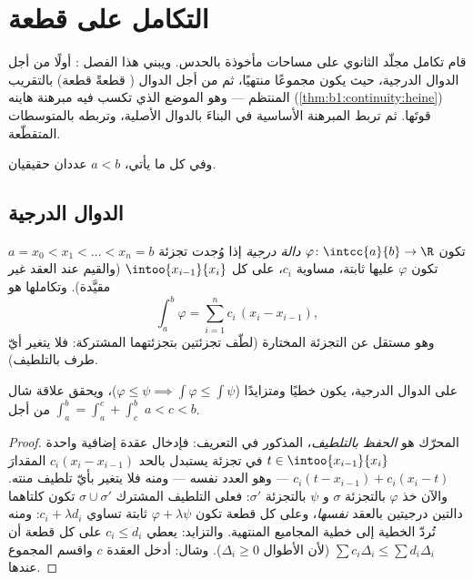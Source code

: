 \chapter{التكامل على قطعة}\label{ch:b1:integration}

قام تكامل مجلّد الثانوي على مساحات مأخوذة
بالحدس. ويبني هذا الفصل : أولًا من أجل الدوال الدرجية،
حيث يكون  مجموعًا منتهيًا، ثم من أجل الدوال  (
قطعةً قطعة) بالتقريب المنتظم --- وهو الموضع الذي تكسب فيه
مبرهنة هاينه (\cref{thm:b1:continuity:heine}) قوتَها.
ثم تربط المبرهنة الأساسية في  البناءَ
بالدوال الأصلية، وتربطه  بالمتوسطات المتقطّعة.

وفي كل ما يأتي، $a < b$ عددان حقيقيان.

\section{الدوال الدرجية}

\begin{definition}\label{def:b1:integration:step}
تكون $\varphi \colon \intcc{a}{b} \to \R$ \emph{دالة
درجية} إذا وُجدت تجزئة $a = x_0
< x_1 < \dots < x_n = b$ تكون $\varphi$ عليها ثابتة، مساوية
$c_i$، على كل   $\intoo{x_{i-1}}{x_i}$ (والقيم عند
العقد غير مقيَّدة). وتكاملها هو
\[
\int_a^b \varphi = \sum_{i=1}^{n} c_i\,(x_i - x_{i-1}),
\]
وهو مستقل عن التجزئة المختارة (لطّف تجزئتين
بتجزئتهما المشتركة: فلا يتغير أيّ طرف بالتلطيف).
\end{definition}

\begin{proposition}\label{prop:b1:integration:stepprops}
على الدوال الدرجية، يكون  خطيًا ومتزايدًا ($\varphi \leq
\psi \implies \int\varphi \leq \int\psi$)، ويحقق علاقة
شال $\int_a^b = \int_a^c + \int_c^b$ من أجل $a < c < b$.
\end{proposition}

\begin{proof}
المحرّك هو \emph{الحفظ بالتلطيف}، المذكور في
التعريف: فإدخال عقدة إضافية واحدة $t \in \intoo{x_{i-1}}{x_i}$
في تجزئة يستبدل بالحد $c_i(x_i - x_{i-1})$ المقدارَ
$c_i(t - x_{i-1}) + c_i(x_i - t)$ --- وهو العدد نفسه --- ومنه فلا
يتغير  بأيّ تلطيف منته. والآن خذ
$\varphi$ بالتجزئة $\sigma$ و $\psi$ بالتجزئة
$\sigma'$: فعلى التلطيف المشترك $\sigma \cup \sigma'$ تكون كلتاهما
دالتين درجيتين بالعقد \emph{نفسها}، وعلى كل قطعة تكون
$\varphi + \lambda\psi$ ثابتة تساوي $c_i + \lambda
d_i$: ومنه تُردّ الخطية إلى خطية المجاميع المنتهية. والتزايد:
يعطي $c_i \leq d_i$ على كل قطعة أن $\sum c_i \Delta_i \leq \sum
d_i \Delta_i$ (لأن الأطوال $\Delta_i \geq 0$). وشال: أدخل
العقدة $c$ واقسم المجموع عندها.
\end{proof}


